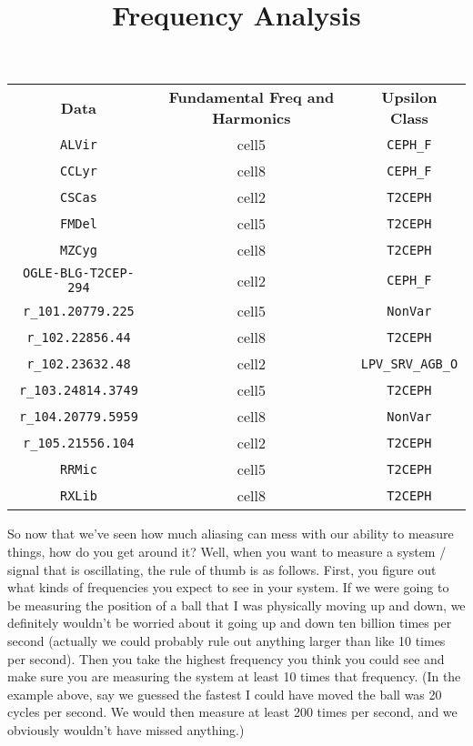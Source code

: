 \documentclass[12pt]{article}
\begin{document}
\maketitle
\clearpage
\setlength{\parindent}{0pt}
\newcommand{\forceindent}{\leavevmode{\parindent=1em\indent}}
\captionsetup[subfigure]{labelformat=empty}
\captionsetup[figure]{labelformat=empty}


\title{\textbf{{\Large Frequency Analysis}}}

\begin{center}
\begin{tabular}{ c c c }
 \textbf{Data} & \textbf{Fundamental Freq and Harmonics}  & \textbf{Upsilon Class} \\ 
 \texttt{ALVir} & cell5 & \texttt{CEPH\_F} \\  
 \texttt{CCLyr} & cell8 & \texttt{CEPH\_F} \\
 \texttt{CSCas} & cell2 & \texttt{T2CEPH} \\ 
 \texttt{FMDel} & cell5 & \texttt{T2CEPH} \\  
 \texttt{MZCyg} & cell8 & \texttt{T2CEPH} \\
 \texttt{OGLE-BLG-T2CEP-294} & cell2 & \texttt{CEPH\_F} \\ 
 \texttt{r\_101.20779.225} & cell5 & \texttt{NonVar} \\  
 \texttt{r\_102.22856.44} & cell8 & \texttt{T2CEPH} \\
 \texttt{r\_102.23632.48} & cell2 & \texttt{LPV\_SRV\_AGB\_O} \\ 
 \texttt{r\_103.24814.3749} & cell5 & \texttt{T2CEPH} \\  
 \texttt{r\_104.20779.5959} & cell8 & \texttt{NonVar} \\
 \texttt{r\_105.21556.104} & cell2 & \texttt{T2CEPH} \\ 
 \texttt{RRMic} & cell5 & \texttt{T2CEPH} \\  
 \texttt{RXLib} & cell8 & \texttt{T2CEPH}     
\end{tabular}
\end{center}

So now that we've seen how much aliasing can mess with our ability to measure things, how do you get around it? Well, when you want to measure a system / signal that is oscillating, the rule of thumb is as follows. First, you figure out what kinds of frequencies you expect to see in your system. If we were going to be measuring the position of a ball that I was physically moving up and down, we definitely wouldn't be worried about it going up and down ten billion times per second (actually we could probably rule out anything larger than like 10 times per second). Then you take the highest frequency you think you could see and make sure you are measuring the system at least 10 times that frequency. (In the example above, say we guessed the fastest I could have moved the ball was 20 cycles per second. We would then measure at least 200 times per second, and we obviously wouldn't have missed anything.) 
\end{document}
